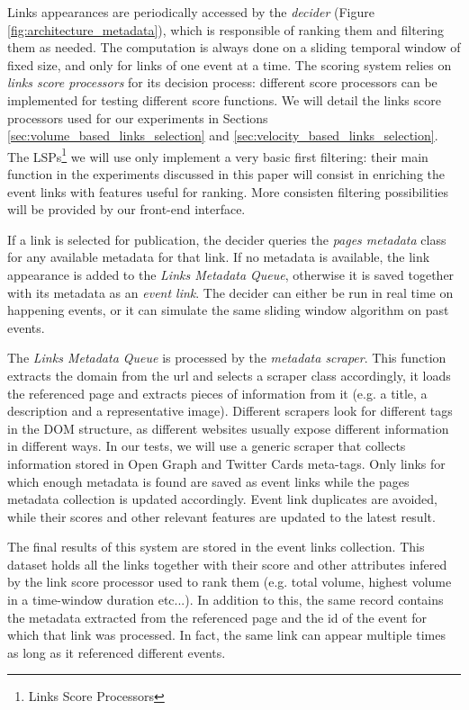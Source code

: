 \documentclass{sig-alternate}
\begin{document}
Links appearances are periodically accessed by the \emph{decider} (Figure \ref{fig:architecture_metadata}), which is responsible of ranking them and filtering them as needed. The computation is always done on a sliding temporal window of fixed size, and only for links of one event at a time. The scoring system relies on \emph{links score processors} for its decision process: different score processors can be implemented for testing different score functions. We will detail the links score processors used for our experiments in Sections \ref{sec:volume_based_links_selection} and \ref{sec:velocity_based_links_selection}. The LSPs\footnote{Links Score Processors} we will use only implement a very basic first filtering: their main function in the experiments discussed in this paper will consist in enriching the event links with features useful for ranking. More consisten filtering possibilities will be provided by our front-end interface.

If a link is selected for publication, the decider queries the \emph{pages metadata} class for any available metadata for that link. If no metadata is available, the link appearance is added to the \emph{Links Metadata Queue}, otherwise it is saved together with its metadata as an \emph{event link}. The decider can either be run in real time on happening events, or it can simulate the same sliding window algorithm on past events.

The \emph{Links Metadata Queue} is processed by the \emph{metadata scraper}. This function extracts the domain from the url and selects a scraper class accordingly, it loads the referenced page and extracts pieces of information from it (e.g. a title, a description and a representative image). Different scrapers look for different tags in the DOM structure, as different websites usually expose different information in different ways. In our tests, we will use a generic scraper that collects information stored in Open Graph and Twitter Cards meta-tags. Only links for which enough metadata is found are saved as event links while the pages metadata collection is updated accordingly. Event link duplicates are avoided, while their scores and other relevant features are updated to the latest result.

The final results of this system are stored in the event links collection. This dataset holds all the links together with their score and other attributes infered by the link score processor used to rank them (e.g. total volume, highest volume in a time-window duration etc...). In addition to this, the same record contains the metadata extracted from the referenced page and the id of the event for which that link was processed. In fact, the same link can appear multiple times as long as it referenced different events.
\end{document}
